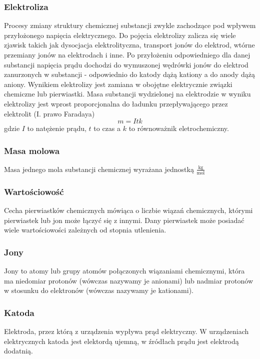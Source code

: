 \documentclass[a4paper,12pts]{article}
\begin{document}
			\subsubsection{Elektroliza}
			Procesy zmiany struktury chemicznej substancji zwykle zachodzące pod wpływem przyłożonego napięcia elektrycznego. Do pojęcia elektrolizy zalicza się wiele zjawisk takich jak dysocjacja elektrolityczna, transport jonów do elektrod, wtórne przemiany jonów na elektrodach i inne. Po przyłożeniu odpowiedniego dla danej substancji napięcia prądu dochodzi do wymuszonej wędrówki jonów do elektrod zanurzonych w  substancji - odpowiednio do katody dążą kationy a do anody dążą aniony. Wynikiem elektrolizy jest zamiana w obojętne elektrycznie związki chemiczne lub pierwiastki. Masa substancji wydzielonej na elektrodzie w wyniku elektrolizy jest wprost proporcjonalna do ładunku przepływającego przez elektrolit (I. prawo Faradaya)
			\begin{equation}
				m = Itk
			\end{equation}
			gdzie $I$ to natężenie prądu, $t$ to czas a $k$ to równoważnik eletrochemiczny.
			
			\subsubsection{Masa molowa}
			Masa jednego mola substancji chemicznej wyrażana jednostką $\frac{\textrm{kg}}{\textrm{mol}}$
			
			\subsubsection{Wartościowość}
			Cecha pierwiastków chemicznych mówiąca o liczbie wiązań chemicznych, którymi pierwiastek lub jon może łączyć się z innymi. Dany pierwiastek może posiadać wiele wartościowości zależnych od stopnia utlenienia.
			
			\subsubsection{Jony}
			Jony to atomy lub grupy atomów połączonych wiązaniami chemicznymi, która ma niedomiar protonów (wówczas nazywamy je anionami) lub nadmiar protonów w stosunku do elektronów (wówczas nazywamy je kationami).
			
			\subsubsection{Katoda}
			Elektroda, przez którą z urządzenia wypływa prąd elektryczny. W urządzeniach elektrycznych katoda jest elektordą ujemną, w źródłach prądu jest elektrodą dodatnią.
			
\end{document}

